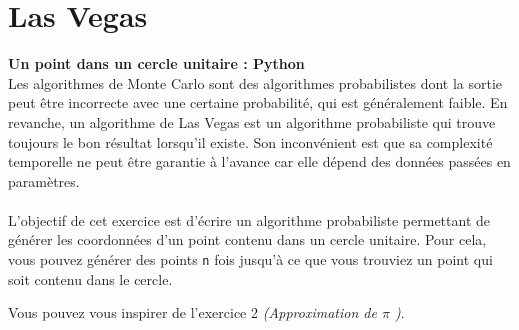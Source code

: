 \begin{Exercice}[15 minutes]
    \begin{solution}
        
    \end{solution}
\end{Exercice}


\section{Las Vegas}

\begin{Exercice}[10 minutes]\textbf{Un point dans un cercle unitaire : Python} \optionnel\\
    Les algorithmes de Monte Carlo sont des algorithmes probabilistes dont la sortie peut être incorrecte avec une certaine probabilité, qui est généralement faible. En revanche, un algorithme de Las Vegas est un algorithme probabiliste qui trouve toujours le bon résultat lorsqu'il existe. Son inconvénient est que sa complexité temporelle ne peut être garantie à l'avance car elle dépend des données passées en paramètres.\\ \\
    L'objectif de cet exercice est d'écrire un algorithme probabiliste permettant de générer les coordonnées d'un point contenu dans un cercle unitaire. Pour cela, vous pouvez générer des points \lstinline{n} fois jusqu'à ce que vous trouviez un point qui soit contenu dans le cercle.
    
    \begin{conseil}
       Vous pouvez vous inspirer de l'exercice 2 \textit{(Approximation de $\pi$ )}.
    \end{conseil}
    \begin{solution}
     
    \end{solution}
    \end{Exercice}

